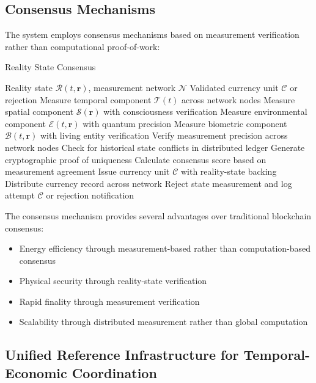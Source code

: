 \documentclass[12pt,a4paper]{article}
\begin{document}
\subsection{Consensus Mechanisms}

The system employs consensus mechanisms based on measurement verification rather than computational proof-of-work:

\begin{algorithm}
\caption{Reality State Consensus}
\begin{algorithmic}[1]
\Require Reality state $\mathcal{R}(t,\mathbf{r})$, measurement network $\mathcal{N}$
\Ensure Validated currency unit $\mathcal{C}$ or rejection
\State Measure temporal component $\mathcal{T}(t)$ across network nodes
\State Measure spatial component $\mathcal{S}(\mathbf{r})$ with consciousness verification
\State Measure environmental component $\mathcal{E}(t,\mathbf{r})$ with quantum precision
\State Measure biometric component $\mathcal{B}(t,\mathbf{r})$ with living entity verification
\State Verify measurement precision across network nodes
\State Check for historical state conflicts in distributed ledger
\State Generate cryptographic proof of uniqueness
\State Calculate consensus score based on measurement agreement
    \State Issue currency unit $\mathcal{C}$ with reality-state backing
    \State Distribute currency record across network
\Else
    \State Reject state measurement and log attempt
\EndIf
\Return $\mathcal{C}$ or rejection notification
\end{algorithmic}
\end{algorithm}

The consensus mechanism provides several advantages over traditional blockchain consensus:
\begin{itemize}
\item Energy efficiency through measurement-based rather than computation-based consensus
\item Physical security through reality-state verification
\item Rapid finality through measurement verification
\item Scalability through distributed measurement rather than global computation
\end{itemize}

\subsection{Unified Reference Infrastructure for Temporal-Economic Coordination}
\end{document}
